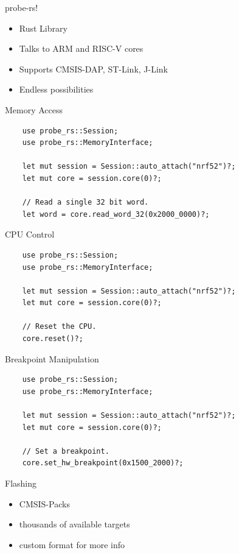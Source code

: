 \documentclass[aspectratio=1610,14pt,t]{beamer}
\begin{document}
\begin{frame}[c]{probe-rs!}
  \begin{itemize}
    \item Rust Library
    \item Talks to ARM and RISC-V cores
    \item Supports CMSIS-DAP, ST-Link, J-Link
    \item Endless possibilities
  \end{itemize}
\end{frame}

\begin{frame}[c,fragile]{Memory Access}
  \begin{verbatim}
    use probe_rs::Session;
    use probe_rs::MemoryInterface;

    let mut session = Session::auto_attach("nrf52")?;
    let mut core = session.core(0)?;

    // Read a single 32 bit word.
    let word = core.read_word_32(0x2000_0000)?;
  \end{verbatim}
\end{frame}

\begin{frame}[c,fragile]{CPU Control}
  \begin{verbatim}
    use probe_rs::Session;
    use probe_rs::MemoryInterface;

    let mut session = Session::auto_attach("nrf52")?;
    let mut core = session.core(0)?;

    // Reset the CPU.
    core.reset()?;
  \end{verbatim}
\end{frame}

\begin{frame}[c,fragile]{Breakpoint Manipulation}
  \begin{verbatim}
    use probe_rs::Session;
    use probe_rs::MemoryInterface;

    let mut session = Session::auto_attach("nrf52")?;
    let mut core = session.core(0)?;

    // Set a breakpoint.
    core.set_hw_breakpoint(0x1500_2000)?;
  \end{verbatim}
\end{frame}

\begin{frame}[c,fragile]{Flashing}
  \begin{itemize}
    \item CMSIS-Packs
    \item thousands of available targets
    \item custom format for more info
  \end{itemize}
\end{frame}
\end{document}
